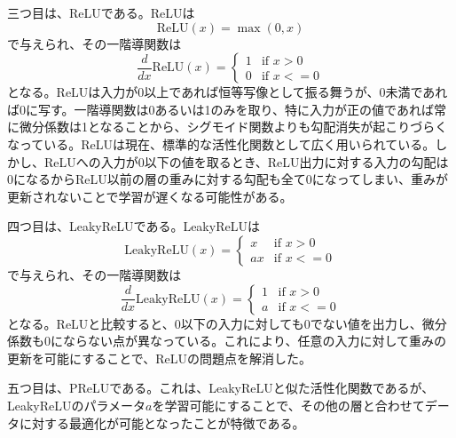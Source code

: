 \documentclass[12pt]{jarticle}
\numberwithin{equation}{section}    %
\numberwithin{figure}{section}      %
\numberwithin{table}{section}      %
\begin{document}
三つ目は、ReLUである。ReLUは
\begin{equation}
    \text{ReLU}(x) = \max (0, x)
\end{equation}
で与えられ、その一階導関数は
\begin{equation}
    \frac{d}{dx}\text{ReLU}(x) =
    \begin{cases}
        1 & \text{if $x > 0$}  \\
        0 & \text{if $x <= 0$}
    \end{cases}
\end{equation}
となる。ReLUは入力が0以上であれば恒等写像として振る舞うが、0未満であれば0に写す。一階導関数は0あるいは1のみを取り、特に入力が正の値であれば常に微分係数は1となることから、シグモイド関数よりも勾配消失が起こりづらくなっている。ReLUは現在、標準的な活性化関数として広く用いられている。しかし、ReLUへの入力が0以下の値を取るとき、ReLU出力に対する入力の勾配は0になるからReLU以前の層の重みに対する勾配も全て0になってしまい、重みが更新されないことで学習が遅くなる可能性がある。

四つ目は、LeakyReLU\cite{maas2013rectifier}である。LeakyReLUは
\begin{equation}
    \text{LeakyReLU}(x) =
    \begin{cases}
        x  & \text{if $x > 0$}  \\
        ax & \text{if $x <= 0$}
    \end{cases}
\end{equation}
で与えられ、その一階導関数は
\begin{equation}
    \frac{d}{dx}\text{LeakyReLU}(x) =
    \begin{cases}
        1 & \text{if $x > 0$}  \\
        a & \text{if $x <= 0$}
    \end{cases}
\end{equation}
となる。ReLUと比較すると、0以下の入力に対しても0でない値を出力し、微分係数も0にならない点が異なっている。これにより、任意の入力に対して重みの更新を可能にすることで、ReLUの問題点を解消した。

五つ目は、PReLU\cite{he2015delving}である。これは、LeakyReLUと似た活性化関数であるが、LeakyReLUのパラメータ$a$を学習可能にすることで、その他の層と合わせてデータに対する最適化が可能となったことが特徴である。
\end{document}
